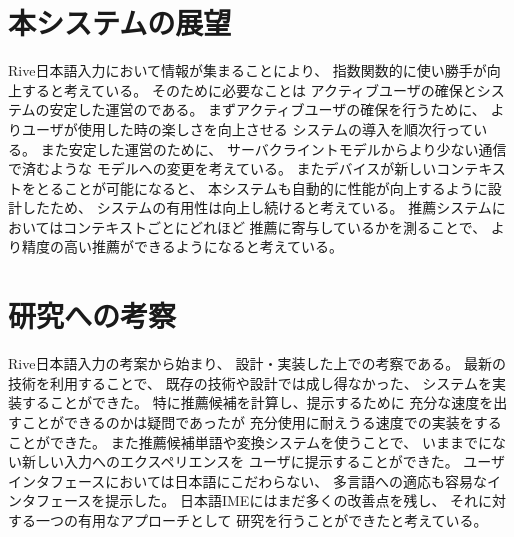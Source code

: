 \section{本システムの展望}
Rive日本語入力において情報が集まることにより、
指数関数的に使い勝手が向上すると考えている。
そのために必要なことは
アクティブユーザの確保とシステムの安定した運営のである。
まずアクティブユーザの確保を行うために、
よりユーザが使用した時の楽しさを向上させる
システムの導入を順次行っている。
また安定した運営のために、
サーバクライントモデルからより少ない通信で済むような
モデルへの変更を考えている。
またデバイスが新しいコンテキストをとることが可能になると、
本システムも自動的に性能が向上するように設計したため、
システムの有用性は向上し続けると考えている。
推薦システムにおいてはコンテキストごとにどれほど
推薦に寄与しているかを測ることで、
より精度の高い推薦ができるようになると考えている。

\section{研究への考察}
Rive日本語入力の考案から始まり、
設計・実装した上での考察である。
最新の技術を利用することで、
既存の技術や設計では成し得なかった、
システムを実装することができた。
特に推薦候補を計算し、提示するために
充分な速度を出すことができるのかは疑問であったが
充分使用に耐えうる速度での実装をすることができた。
また推薦候補単語や変換システムを使うことで、
いままでにない新しい入力へのエクスペリエンスを
ユーザに提示することができた。
ユーザインタフェースにおいては日本語にこだわらない、
多言語への適応も容易なインタフェースを提示した。
日本語IMEにはまだ多くの改善点を残し、
それに対する一つの有用なアプローチとして
研究を行うことができたと考えている。

